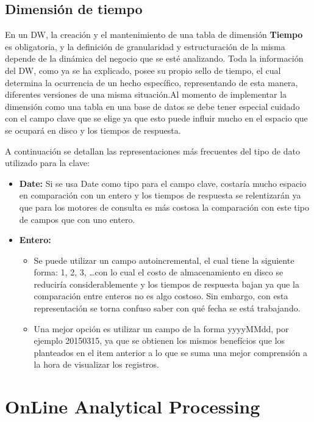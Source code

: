 \documentclass[a4paper,11pt]{article}
\begin{document}
    
    \subsection{Dimensión de tiempo}
    
    En un DW, la creación y el mantenimiento de una tabla de dimensión \textbf{Tiempo} es obligatoria, y la definición de granularidad y estructuración de la misma 
    depende de la dinámica del negocio que se esté analizando. Toda la información del DW, como ya se ha explicado, posee su propio sello de 
    tiempo, el cual determina la ocurrencia de un hecho específico, representando de esta manera, diferentes versiones de una misma situación.Al momento de 
    implementar la dimensión como una tabla en una base de datos se debe tener especial cuidado con el campo clave que se elige ya que esto puede influir 
    mucho en el espacio que se ocupará en disco y los tiempos de respuesta.\par
    
    A continuación se detallan las representaciones más frecuentes del tipo de dato utilizado para la clave:
    
    \begin{itemize}
      \item \textbf{Date:} Si se usa Date como tipo para  el campo clave, costaría mucho espacio en comparación con un entero y los tiempos de respuesta se
      relentizarán ya que para los motores de consulta es más costosa la comparación con este tipo de campos que con uno entero.
      \item \textbf{Entero:}
      \begin{itemize}
        \item Se puede utilizar un campo autoincremental, el cual tiene la siguiente forma: 1, 2, 3, \dots con lo cual el costo de almacenamiento en disco
        se reduciría considerablemente y los tiempos de respuesta bajan ya que la comparación entre enteros no es algo costoso. Sin embargo, con esta representación se
        torna confuso saber con qué fecha se está trabajando.
        \item Una mejor opción es utilizar un campo de la forma yyyyMMdd, por ejemplo 20150315, ya que se obtienen los mismos benefícios que los planteados
        en el item anterior a lo que se suma una mejor comprensión a la hora de visualizar los registros.
      \end{itemize}
    \end{itemize}
    
    
    \section{OnLine Analytical Processing}
    
\end{document}

